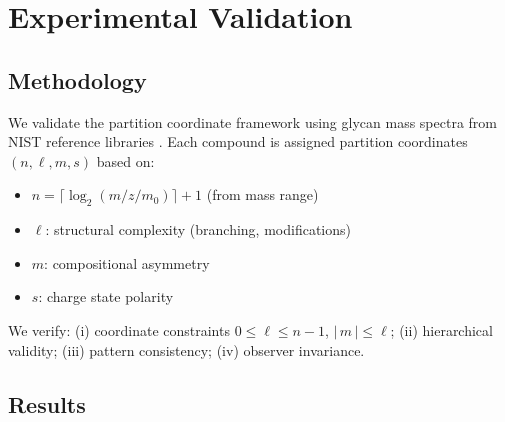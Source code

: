 \documentclass[twocolumn,10pt,a4paper]{article}
\theoremstyle{definition}
\theoremstyle{remark}
\begin{document}
\section{Experimental Validation}
\label{sec:validation}

\subsection{Methodology}

We validate the partition coordinate framework using glycan mass spectra from NIST reference libraries \citep{nist2023glycan,nist2020srm1953}. Each compound is assigned partition coordinates $(n, \ell, m, s)$ based on:
\begin{itemize}
    \item $n = \lceil\log_2(m/z / m_0)\rceil + 1$ (from mass range)
    \item $\ell$: structural complexity (branching, modifications)
    \item $m$: compositional asymmetry
    \item $s$: charge state polarity
\end{itemize}

We verify: (i) coordinate constraints $0 \leq \ell \leq n-1$, $|\,m\,| \leq \ell$; (ii) hierarchical validity; (iii) pattern consistency; (iv) observer invariance.

\subsection{Results}
\end{document}
